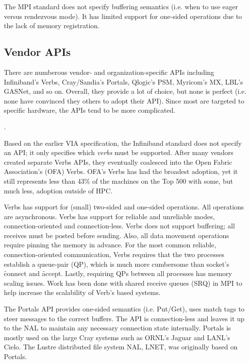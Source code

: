 \documentclass[conference]{IEEEtran}
\begin{document}
The MPI standard does not specify buffering semantics (i.e. when to use eager versus
rendezvous mode). It has limited support for one-sided operations due to the lack of
memory registration.

\subsection{Vendor APIs} There are numberous vendor- and organization-specific APIs
including Infiniband's Verbs\cite{ofa-verbs}, Cray/Sandia's Portals\cite{portals}, Qlogic's
PSM\cite{psm}, Myricom's MX\cite{mx}, LBL's GASNet\cite{gasnet}, and so on.  Overall, they
provide a lot of choice, but none is perfect (i.e. none have convinced they others to
adopt their API).  Since most are targeted to specific hardware, the APIs tend to be more
complicated.

.

Based on the earlier VIA specification\cite{via}, the Infiniband standard does not specify
an API; it only specifies which \emph{verbs} must be supported. After many vendors created
separate Verbs APIs, they eventually coalesced into the Open Fabric Association's (OFA)
Verbs. OFA's Verbs has had the broadest adoption, yet it still represents less than 43\%
of the machines on the Top 500\cite{top500} with some, but much less, adoption outside of
HPC.

Verbs has support for (small) two-sided and one-sided operations. All operations are
asynchronous. Verbs has support for reliable and unreliable modes, connection-oriented
and connection-less. Verbs does not support buffering; all receives must be posted before
sending. Also, all data movement operations require pinning the memory in advance. For the
most common reliable, connection-oriented communication, Verbs requires that the two
processes establish a queue-pair (QP), which is much more cumbersome than socket's
\f{connect} and \f{accept}. Lastly, requiring QPs between all processes has memory scaling
issues. Work has been done with shared receive queues (SRQ) in MPI\cite{srq} to help
increase the scalability of Verb's based systems.

The Portals API provides one-sided semantics (i.e.  Put/Get), uses match tags to steer
messages to the correct buffers. The API is connection-less and leaves it up to the NAL to
maintain any necessary connection state internally. Portals is mostly used on the large
Cray systems such as ORNL's Jaguar\cite{jaguar} and LANL's Cielo\cite{cielo}.  The
Lustre distributed file system NAL, LNET, was originally based on Portals\cite{lnet}.
\end{document}
